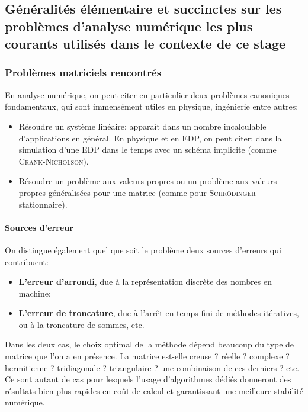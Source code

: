 \documentclass[svgnames,dvipsnames,a4paper,10pt,french]{report}
\begin{document}
\subsection{Généralités élémentaire et succinctes sur les problèmes d'analyse numérique les plus courants utilisés dans le contexte de ce stage}
\label{generalites_elt_analyse_num}
\subsubsection{Problèmes matriciels rencontrés}
En analyse numérique, on peut citer en particulier deux problèmes canoniques fondamentaux, qui sont immensément utiles en physique, ingénierie entre autres:
\begin{itemize}
    \item Résoudre un système linéaire: apparaît dans un nombre incalculable d'applications en général. En physique et en EDP, on peut citer: dans la simulation d'une EDP dans le temps avec un schéma implicite (comme \textsc{Crank-Nicholson}).
    
    \item Résoudre un problème aux valeurs propres ou un problème aux valeurs propres généralisées pour une matrice (comme pour \textsc{Schrödinger} stationnaire).
\end{itemize}

\paragraph{Sources d'erreur}
On distingue également quel que soit le problème deux sources d'erreurs qui contribuent:
\begin{itemize}
    \item \textbf{L'erreur d'arrondi}, due à la représentation discrète des nombres en machine;
    \item \textbf{L'erreur de troncature}, due à l'arrêt en temps fini de méthodes itératives, ou à la troncature de sommes, etc.
\end{itemize}

Dans les deux cas, le choix optimal de la méthode dépend beaucoup du type de matrice que l'on a en présence. La matrice est-elle creuse ? réelle ? complexe ? hermitienne ? tridiagonale ? triangulaire ? une combinaison de ces derniers ? etc. Ce sont autant de cas pour lesquels l'usage d'algorithmes dédiés donneront des résultats bien plus rapides en coût de calcul et garantissant une meilleure stabilité numérique. 
\end{document}
